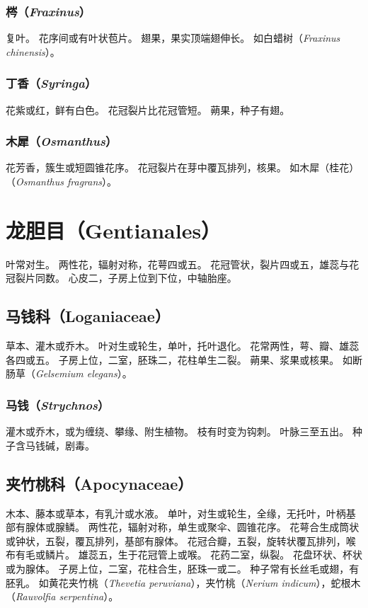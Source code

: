 \documentclass[11pt]{article}
\begin{document}
\begin{sloppypar}
\subsubsection{梣（\textit{Fraxinus}）}
复叶。
花序间或有叶状苞片。
翅果，果实顶端翅伸长。
如白蜡树（\textit{Fraxinus chinensis}）。

\subsubsection{丁香（\textit{Syringa}）}
花紫或红，鲜有白色。
花冠裂片比花冠管短。
蒴果，种子有翅。

\subsubsection{木犀（\textit{Osmanthus}）}
花芳香，簇生或短圆锥花序。
花冠裂片在芽中覆瓦排列，核果。
如木犀（桂花）（\textit{Osmanthus fragrans}）。

\section{龙胆目（Gentianales）}
叶常对生。
两性花，辐射对称，花萼四或五。
花冠管状，裂片四或五，雄蕊与花冠裂片同数。
心皮二，子房上位到下位，中轴胎座。


\subsection{马钱科（Loganiaceae）}
草本、灌木或乔木。
叶对生或轮生，单叶，托叶退化。
花常两性，萼、瓣、雄蕊各四或五。
子房上位，二室，胚珠二，花柱单生二裂。
蒴果、浆果或核果。
如断肠草（\textit{Gelsemium elegans}）。

\subsubsection{马钱（\textit{Strychnos}）}
灌木或乔木，或为缠绕、攀缘、附生植物。
枝有时变为钩刺。
叶脉三至五出。
种子含马钱碱，剧毒。

\subsection{夹竹桃科（Apocynaceae）}
木本、藤本或草本，有乳汁或水液。
单叶，对生或轮生，全缘，无托叶，叶柄基部有腺体或腺鳞。
两性花，辐射对称，单生或聚伞、圆锥花序。
花萼合生成筒状或钟状，五裂，覆瓦排列，基部有腺体。
花冠合瓣，五裂，旋转状覆瓦排列，喉布有毛或鳞片。
雄蕊五，生于花冠管上或喉。
花药二室，纵裂。
花盘环状、杯状或为腺体。
子房上位，二室，花柱合生，胚珠一或二。
种子常有长丝毛或翅，有胚乳。
如黄花夹竹桃（\textit{Thevetia peruviana}），夹竹桃（\textit{Nerium indicum}），蛇根木（\textit{Rauvolfia serpentina}）。


\end{sloppypar}
\end{document}
